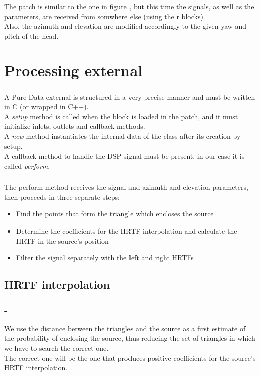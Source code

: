 \documentclass{beamer}
\begin{document}
	\begin{frame}
		\frametitle{\insertsection}
		The patch is similar to the one in figure \label{fig:test}, but this time the signals, as
		well as the parameters, are received from somwhere else (using the r blocks).\\
		Also, the azimuth and elevation are modified accordingly to the given yaw and pitch of
		the head.\\
	\end{frame}

	\section{Processing external}

	\begin{frame}
		\frametitle{\insertsection}
		A Pure Data external is structured in a very precise manner and must be	written in C (or wrapped in C++).\\
		A {\em setup} method is called when the block is loaded in the patch, and it must initialize inlets,
		outlets and callback methods.\\
		A {\em new} method instantiates the internal data of the class after its creation by setup.\\
		A callback method to handle the DSP signal must be present, in our case it is called {\em perform}.\\
	\end{frame}

	\begin{frame}
		\frametitle{\insertsection}
		The perform method receives the signal and azimuth and elevation parameters,
		then proceeds in three separate steps:
		\begin{itemize}
			\item Find the points that form the triangle which encloses the source
			\item Determine the coefficients for the HRTF interpolation and calculate the HRTF in the source's
				position
			\item Filter the signal separately with the left and right HRTFs
		\end{itemize}
	\end{frame}

	\subsection{HRTF interpolation}

	\begin{frame}
		\frametitle{\insertsection - \insertsubsection}
		We use the distance between the triangles and the source as a first estimate of the probability of enclosing
		the source, thus reducing the set of triangles in which we have to search the correct one.\\
		The correct one will be the one that produces positive coefficients for the source's HRTF interpolation.\\
	\end{frame}
\end{document}

